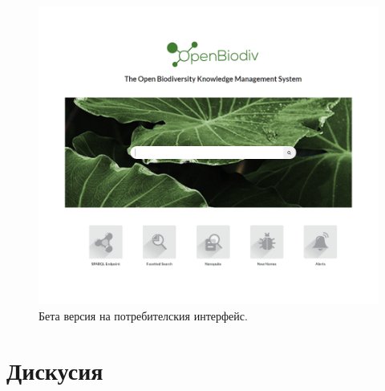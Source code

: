 \begin{figure}
\centering
\includegraphics[width=\textwidth]{Figures/openbiodiv-webpage}
\decoRule
\caption[OpenBiodiv Website]{Бета версия на потребителския интерфейс.}
\label{fig:website}
\end{figure}

\section{Дискусия}


